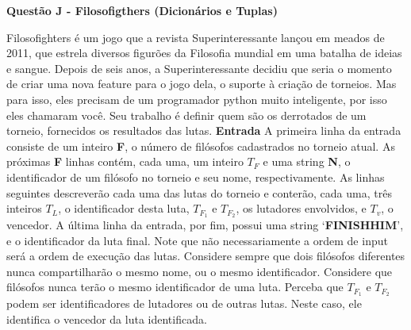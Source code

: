 \documentclass[a4paper, 12pt]{article}
\begin{document}
\newpage %
\begin{center}
\textbf{{\Large Questão J - Filosofigthers (Dicionários e Tuplas)}}
\end{center}
\vspace{5pt}
Filosofighters é um jogo que a revista Superinteressante lançou em meados de
2011, que estrela diversos figurões da Filosofia mundial em uma batalha de ideias
e sangue. \newline \newline
Depois de seis anos, a Superinteressante decidiu que seria o momento de criar
uma nova feature para o jogo dela, o suporte à criação de torneios. Mas para isso,
eles precisam de um programador python muito inteligente, por isso eles
chamaram você. \newline \newline
Seu trabalho é definir quem são os derrotados de um torneio, fornecidos os
resultados das lutas.
\newline \newline
\textbf{{\large Entrada}} \newline
A primeira linha da entrada consiste de um inteiro \textbf{F}, o número de filósofos
cadastrados no torneio atual. \newline
As próximas \textbf{F} linhas contém, cada uma, um inteiro $T_F$ e uma string \textbf{N}, o
identificador de um filósofo no torneio e seu nome, respectivamente. \newline
As linhas seguintes descreverão cada uma das lutas do torneio e conterão, cada
uma, três inteiros $T_L$, o identificador desta luta, $T_{F_1}$ e $T_{F_2}$, os lutadores envolvidos, e
$T_v$, o vencedor. \newline
A última linha da entrada, por fim, possui uma string `\textbf{FINISHHIM}', e o identificador
da luta final. \newline
Note que não necessariamente a ordem de input será a ordem de execução das
lutas. \newline \newline
Considere sempre que dois filósofos diferentes nunca compartilharão o mesmo
nome, ou o mesmo identificador. \newline
Considere que filósofos nunca terão o mesmo identificador de uma luta. \newline
Perceba que $T_{F_1}$ e $T_{F_2}$ podem ser identificadores de lutadores ou de outras lutas.
Neste caso, ele identifica o vencedor da luta identificada.
\newline \newline
\end{document}
